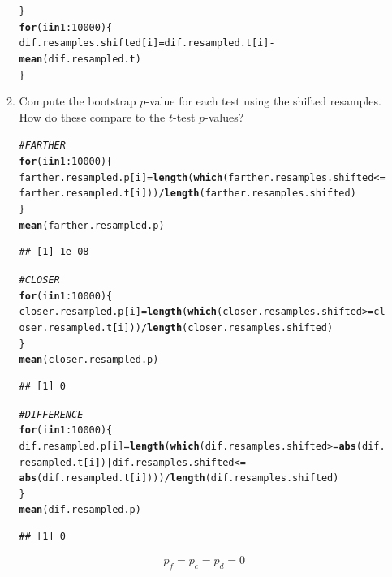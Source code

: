 \documentclass{article}\usepackage[]{graphicx}\usepackage[]{xcolor}
\makeatletter
\newcommand{\hlnum}[1]{\textcolor[rgb]{0.686,0.059,0.569}{#1}}%
\newcommand{\hlcom}[1]{\textcolor[rgb]{0.678,0.584,0.686}{\textit{#1}}}%
\newcommand{\hlopt}[1]{\textcolor[rgb]{0,0,0}{#1}}%
\newcommand{\hldef}[1]{\textcolor[rgb]{0.345,0.345,0.345}{#1}}%
\newcommand{\hlkwa}[1]{\textcolor[rgb]{0.161,0.373,0.58}{\textbf{#1}}}%
\newcommand{\hlkwb}[1]{\textcolor[rgb]{0.69,0.353,0.396}{#1}}%
\newcommand{\hlkwd}[1]{\textcolor[rgb]{0.737,0.353,0.396}{\textbf{#1}}}%
\newenvironment{kframe}{%
 \def\at@end@of@kframe{}%
 \ifinner\ifhmode%
  \def\at@end@of@kframe{\end{minipage}}%
  \begin{minipage}{\columnwidth}%
 \fi\fi%
 \def\FrameCommand##1{\hskip\@totalleftmargin \hskip-\fboxsep
 \colorbox{shadecolor}{##1}\hskip-\fboxsep
     \hskip-\linewidth \hskip-\@totalleftmargin \hskip\columnwidth}%
 \MakeFramed {\advance\hsize-\width
   \@totalleftmargin\z@ \linewidth\hsize
   \@setminipage}}%
 {\par\unskip\endMakeFramed%
 \at@end@of@kframe}
\newenvironment{knitrout}{}{} %
\makeatother
\begin{document}
\begin{enumerate}
\begin{enumerate}
\begin{knitrout}
\begin{kframe}
\begin{alltt}
\hldef{\}}
\hlkwa{for}\hldef{(i} \hlkwa{in} \hlnum{1}\hlopt{:}\hlnum{10000}\hldef{)\{}
\hldef{dif.resamples.shifted[i]} \hlkwb{=} \hldef{dif.resampled.t[i]} \hlopt{-} \hlkwd{mean}\hldef{(dif.resampled.t)}
\hldef{\}}
\end{alltt}
\end{kframe}
\end{knitrout}
  \item Compute the bootstrap $p$-value for each test using the shifted resamples. 
  How do these compare to the $t$-test $p$-values?
\begin{knitrout}\scriptsize
{}\color{fgcolor}\begin{kframe}
\begin{alltt}
\hlcom{#FARTHER}
\hlkwa{for}\hldef{(i} \hlkwa{in} \hlnum{1}\hlopt{:}\hlnum{10000}\hldef{)\{}
\hldef{farther.resampled.p[i]} \hlkwb{=} \hlkwd{length}\hldef{(}\hlkwd{which}\hldef{(farther.resamples.shifted} \hlopt{<=} \hldef{farther.resampled.t[i]))}\hlopt{/}\hlkwd{length}\hldef{(farther.resamples.shifted)}
\hldef{\}}
\hlkwd{mean}\hldef{(farther.resampled.p)}
\end{alltt}
\begin{verbatim}
## [1] 1e-08
\end{verbatim}
\begin{alltt}
\hlcom{#CLOSER}
\hlkwa{for}\hldef{(i} \hlkwa{in} \hlnum{1}\hlopt{:}\hlnum{10000}\hldef{)\{}
\hldef{closer.resampled.p[i]} \hlkwb{=} \hlkwd{length}\hldef{(}\hlkwd{which}\hldef{(closer.resamples.shifted} \hlopt{>=} \hldef{closer.resampled.t[i]))}\hlopt{/}\hlkwd{length}\hldef{(closer.resamples.shifted)}
\hldef{\}}
\hlkwd{mean}\hldef{(closer.resampled.p)}
\end{alltt}
\begin{verbatim}
## [1] 0
\end{verbatim}
\begin{alltt}
\hlcom{#DIFFERENCE}
\hlkwa{for}\hldef{(i} \hlkwa{in} \hlnum{1}\hlopt{:}\hlnum{10000}\hldef{)\{}
\hldef{dif.resampled.p[i]} \hlkwb{=} \hlkwd{length}\hldef{(}\hlkwd{which}\hldef{(dif.resamples.shifted} \hlopt{>=} \hlkwd{abs}\hldef{(dif.resampled.t[i])} \hlopt{|} \hldef{dif.resamples.shifted} \hlopt{<= -}\hlkwd{abs}\hldef{(dif.resampled.t[i])))}\hlopt{/}\hlkwd{length}\hldef{(dif.resamples.shifted)}
\hldef{\}}
\hlkwd{mean}\hldef{(dif.resampled.p)}
\end{alltt}
\begin{verbatim}
## [1] 0
\end{verbatim}
\end{kframe}
\end{knitrout}
\[p_f = p_c = p_d = 0\]


\end{enumerate}
\end{enumerate}
\end{document}
